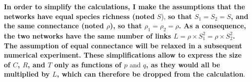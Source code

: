\documentclass[11pt]{article}
\makeatletter
\def\maxwidth{\ifdim\Gin@nat@width>\linewidth\linewidth
\else\Gin@nat@width\fi}
\let\Oldincludegraphics\includegraphics
\renewcommand{\includegraphics}[1]{\Oldincludegraphics[width=\maxwidth]{#1}}
\providecommand{\DIFaddtex}[1]{{\bf #1}} %
\providecommand{\DIFdeltex}[1]{} %
\providecommand{\DIFaddbegin}{\protect\color{blue}} %
\providecommand{\DIFaddend}{\protect\color{black}} %
\providecommand{\DIFdelbegin}{\protect\color{red}} %
\providecommand{\DIFdelend}{\protect\color{black}} %
\providecommand{\DIFadd}[1]{\texorpdfstring{\DIFaddtex{#1}}{#1}} %
\providecommand{\DIFdel}[1]{\texorpdfstring{\DIFdeltex{#1}}{}} %
\newcommand{\DIFscaledelfig}{0.5}
\newlength{\DIFdelgraphicswidth} %
\newlength{\DIFdelgraphicsheight} %
\newcommand{\DIFaddincludegraphics}[2][]{{\color{blue}\fbox{\DIFOincludegraphics[#1]{#2}}}} %
\newcommand{\DIFdelincludegraphics}[2][]{%
\sbox{\DIFdelgraphicsbox}{\DIFOincludegraphics[#1]{#2}}%
\settoboxwidth{\DIFdelgraphicswidth}{\DIFdelgraphicsbox} %
\settoboxtotalheight{\DIFdelgraphicsheight}{\DIFdelgraphicsbox} %
\scalebox{\DIFscaledelfig}{%
\parbox[b]{\DIFdelgraphicswidth}{\usebox{\DIFdelgraphicsbox}\\[-\baselineskip] \rule{\DIFdelgraphicswidth}{0em}}\llap{\resizebox{\DIFdelgraphicswidth}{\DIFdelgraphicsheight}{%
\setlength{\unitlength}{\DIFdelgraphicswidth}%
\begin{picture}(1,1)%
\thicklines\linethickness{2pt} %
{\color[rgb]{1,0,0}\put(0,0){\framebox(1,1){}}}%
{\color[rgb]{1,0,0}\put(0,0){\line( 1,1){1}}}%
{\color[rgb]{1,0,0}\put(0,1){\line(1,-1){1}}}%
\end{picture}%
}\hspace*{3pt}}} %
} %
\DeclareRobustCommand{\DIFaddbegin}{\DIFOaddbegin \let\includegraphics\DIFaddincludegraphics} %
\DeclareRobustCommand{\DIFaddend}{\DIFOaddend \let\includegraphics\DIFOincludegraphics} %
\DeclareRobustCommand{\DIFdelbegin}{\DIFOdelbegin \let\includegraphics\DIFdelincludegraphics} %
\DeclareRobustCommand{\DIFdelend}{\DIFOaddend \let\includegraphics\DIFOincludegraphics} %
\makeatother
\begin{document}
\DIFadd{In order to simplify the calculations, I make the assumptions that the
networks have equal species richness (noted }\DIFaddend \(S\)), \DIFaddbegin \DIFadd{so that
\(S_1 = S_2 = S\), and the same connectance (noted \(\rho\)), so that
\(\rho_1 = \rho_2 = \rho\). As a consequence, the two networks have the
same number of links \(L = \rho\times S_1^2 = \rho\times S_2^2\). The
assumption of equal connectance will be relaxed in a subsequent
numerical experiment. These simplifications allow to express the size of
\(C\), \(R\), and \(T\) only as functions of \(p\) }\DIFaddend and \DIFdelbegin \DIFdel{unique (\(U\))links, with \(A = p_s\times L\), \(S = (1-p_s)\times p_r\times L\), and
\(U = (1-p_s)\times (1-p_r)\times L\). The
results are represented in fig. ~\ref{fig:numexp1}}\DIFdelend \DIFaddbegin \DIFadd{\(q\), as they
would all be multiplied by \(L\), which can therefore be dropped from
the calculation}\DIFaddend .
\end{document}
